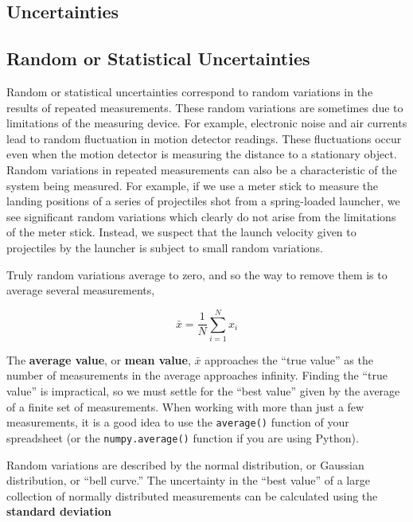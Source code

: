 \documentclass[12pt]{article}
\begin{document}
\thispagestyle{empty}

\begin{latexonly}
  \section*{Uncertainties}
\end{latexonly}

\subsection*{Random or Statistical Uncertainties}

Random or statistical uncertainties correspond to random variations in
the results of repeated measurements. These random variations are
sometimes due to limitations of the measuring device. For example,
electronic noise and air currents lead to random fluctuation in motion
detector readings. These fluctuations occur even when the motion
detector is measuring the distance to a stationary object. Random
variations in repeated measurements can also be a characteristic of
the system being measured. For example, if we use a meter stick to
measure the landing positions of a series of projectiles shot from a
spring-loaded launcher, we see significant random variations which
clearly do not arise from the limitations of the meter stick. Instead,
we suspect that the launch velocity given to projectiles by the
launcher is subject to small random variations. 

Truly random variations average to zero, and so the way to remove
them is to average several measurements,

\begin{equation}
  \bar{x} = \frac{1}{N} \sum_{i=1}^N x_i
\end{equation}

The \textbf{average value}, or \textbf{mean value}, $\bar{x}$
approaches the ``true value'' as the number of measurements in the
average approaches infinity. Finding the ``true value'' is
impractical, so we must settle for the ``best value'' given by the
average of a finite set of measurements. When working with more than
just a few measurements, it is a good idea to use the
\texttt{average()} function of your spreadsheet (or the 
\texttt{numpy.average()} function if you are using Python).

Random variations are described by the normal distribution, or
Gaussian distribution, or ``bell curve.''  The uncertainty in the
``best value'' of a large collection of normally distributed
measurements can be calculated using the \textbf{standard deviation}
\end{document}
